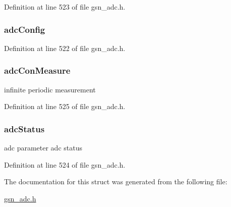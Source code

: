 Definition at line 523 of file gsn\_\-adc.h.

\hypertarget{a00024_aaebeb2c1a57d5d7bd90cd85c581878f6}{
\subsubsection[{adcConfig}]{ {\bf adcConfig}}}
\label{a00024_aaebeb2c1a57d5d7bd90cd85c581878f6}


Definition at line 522 of file gsn\_\-adc.h.

\hypertarget{a00024_ae8569711f564a7efbdd255fd123cfd31}{
\subsubsection[{adcConMeasure}]{ {\bf adcConMeasure}}}
\label{a00024_ae8569711f564a7efbdd255fd123cfd31}
infinite periodic measurement 

Definition at line 525 of file gsn\_\-adc.h.

\hypertarget{a00024_ae7ae66ca06858390a0505501b8a4b42d}{
\subsubsection[{adcStatus}]{ {\bf adcStatus}}}
\label{a00024_ae7ae66ca06858390a0505501b8a4b42d}
adc parameter adc status 

Definition at line 524 of file gsn\_\-adc.h.



The documentation for this struct was generated from the following file:\begin{DoxyCompactItemize}
\item 
\hyperlink{a00474}{gsn\_\-adc.h}\end{DoxyCompactItemize}
